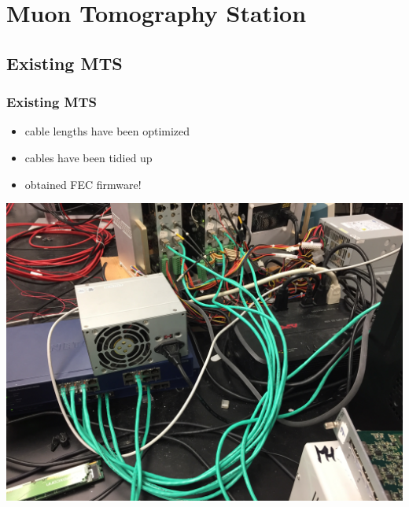 \documentclass[aspectratio=169]{beamer}
\begin{document}

\section{Muon Tomography Station}


\subsection{Existing MTS}

\begin{frame}

  \frametitle{Existing MTS}

  \begin{itemize}
    \item cable lengths have been optimized
    \item cables have been tidied up
    \item obtained FEC firmware!
  \end{itemize}


    \begin{center}
      \includegraphics[scale=0.06]{mtsCables.png}
    \end{center}    

\end{frame}
\end{document}
